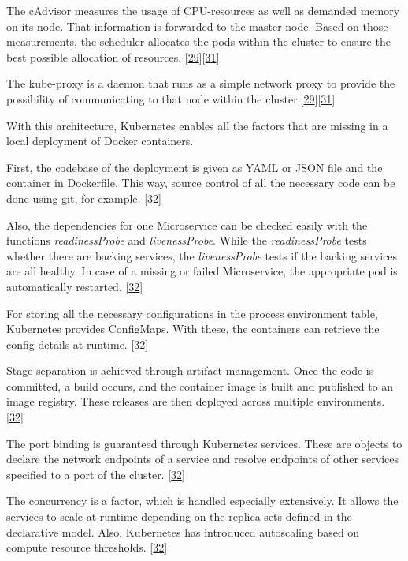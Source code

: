 \documentclass[12pt,english,a4paper,oneside,,tablecaptionabove]{scrbook}
\begin{document}
The cAdvisor measures the usage of CPU-resources as well as demanded
memory on its node. That information is forwarded to the master node.
Based on those measurements, the scheduler allocates the pods within the
cluster to ensure the best possible allocation of resources.
{[}\protect\hyperlink{ref-Fricke}{29}{]}{[}\protect\hyperlink{ref-JorgeAcetozi}{31}{]}

The kube-proxy is a daemon that runs as a simple network proxy to
provide the possibility of communicating to that node within the
cluster.{[}\protect\hyperlink{ref-Fricke}{29}{]}{[}\protect\hyperlink{ref-JorgeAcetozi}{31}{]}

With this architecture, Kubernetes enables all the factors that are
missing in a local deployment of Docker containers.

First, the codebase of the deployment is given as YAML or JSON file and
the container in Dockerfile. This way, source control of all the
necessary code can be done using git, for example.
{[}\protect\hyperlink{ref-MichaelD.Elder}{32}{]}

Also, the dependencies for one Microservice can be checked easily with
the functions \emph{readinessProbe} and \emph{livenessProbe}. While the
\emph{readinessProbe} tests whether there are backing services, the
\emph{livenessProbe} tests if the backing services are all healthy. In
case of a missing or failed Microservice, the appropriate pod is
automatically restarted.
{[}\protect\hyperlink{ref-MichaelD.Elder}{32}{]}

For storing all the necessary configurations in the process environment
table, Kubernetes provides ConfigMaps. With these, the containers can
retrieve the config details at runtime.
{[}\protect\hyperlink{ref-MichaelD.Elder}{32}{]}

Stage separation is achieved through artifact management. Once the code
is committed, a build occurs, and the container image is built and
published to an image registry. These releases are then deployed across
multiple environments. {[}\protect\hyperlink{ref-MichaelD.Elder}{32}{]}

The port binding is guaranteed through Kubernetes services. These are
objects to declare the network endpoints of a service and resolve
endpoints of other services specified to a port of the cluster.
{[}\protect\hyperlink{ref-MichaelD.Elder}{32}{]}

The concurrency is a factor, which is handled especially extensively. It
allows the services to scale at runtime depending on the replica sets
defined in the declarative model. Also, Kubernetes has introduced
autoscaling based on compute resource thresholds.
{[}\protect\hyperlink{ref-MichaelD.Elder}{32}{]}
\end{document}
